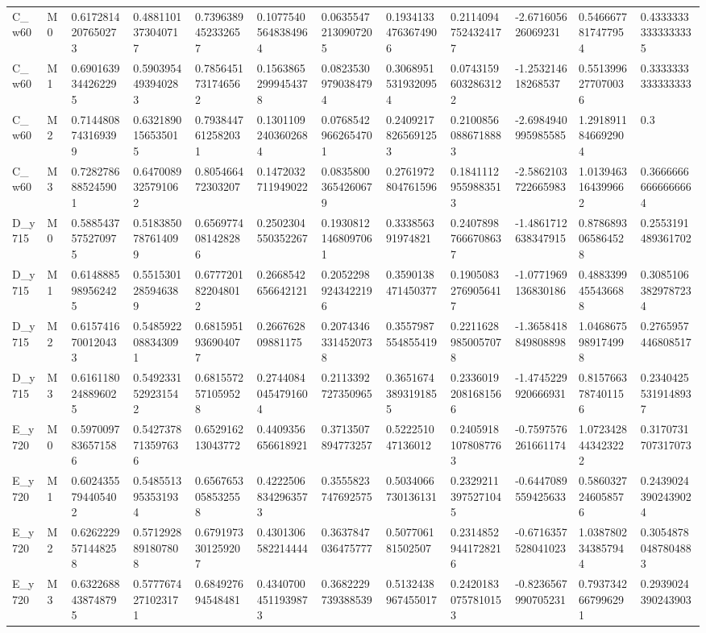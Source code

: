 \begin{tabular}{llllllllllll}
C\_w60 & M0 & 0.6172814207650273 & 0.4881101373040717 & 0.7396389452332657 & 0.10775405648384964 & 0.06355472130907205 & 0.19341334763674906 & 0.21140947524324177 & -2.671605626069231 & 0.5466677817477954 & 0.43333333333333335 \\
C\_w60 & M1 & 0.6901639344262295 & 0.5903954493940283 & 0.7856451731746562 & 0.15638652999454378 & 0.08235309790384794 & 0.30689515319320954 & 0.07431596032863122 & -1.253214618268537 & 0.5513996277070036 & 0.3333333333333333 \\
C\_w60 & M2 & 0.7144808743169399 & 0.6321890156535015 & 0.7938447612582031 & 0.13011092403602684 & 0.07685429662654701 & 0.24092178265691253 & 0.21008560886718883 & -2.6984940995985585 & 1.2918911846692904 & 0.3 \\
C\_w60 & M3 & 0.7282786885245901 & 0.6470089325791062 & 0.805466472303207 & 0.1472032711949022 & 0.08358003654260679 & 0.2761972804761596 & 0.18411129559883513 & -2.5862103722665983 & 1.0139463164399662 & 0.36666666666666664 \\
D\_y715 & M0 & 0.5885437575270975 & 0.5183850787614099 & 0.6569774081428286 & 0.2502304550352267 & 0.19308121468097061 & 0.333856391974821 & 0.24078987666708637 & -1.4861712638347915 & 0.8786893065864528 & 0.2553191489361702 \\
D\_y715 & M1 & 0.6148885989562425 & 0.5515301285946389 & 0.6777201822048012 & 0.2668542656642121 & 0.20522989243422196 & 0.3590138471450377 & 0.19050832769056417 & -1.0771969136830186 & 0.4883399455436688 & 0.30851063829787234 \\
D\_y715 & M2 & 0.6157416700120433 & 0.5485922088343091 & 0.6815951936904077 & 0.266762809881175 & 0.20743463314520738 & 0.3557987554855419 & 0.22116289850057078 & -1.3658418849808898 & 1.0468675989174998 & 0.2765957446808517 \\
D\_y715 & M3 & 0.6161180248896025 & 0.5492331529231542 & 0.6815572571059528 & 0.27440840454791604 & 0.2113392727350965 & 0.36516743893191855 & 0.23360192081681566 & -1.4745229920666931 & 0.8157663787401156 & 0.23404255319148937 \\
E\_y720 & M0 & 0.5970097836571586 & 0.5427378713597636 & 0.652916213043772 & 0.4409356656618921 & 0.3713507894773257 & 0.522251047136012 & 0.24059181078087763 & -0.7597576261661174 & 1.0723428443423222 & 0.3170731707317073 \\
E\_y720 & M1 & 0.6024355794405402 & 0.5485513953531934 & 0.6567653058532558 & 0.42225068342963573 & 0.3555823747692575 & 0.5034066730136131 & 0.23292113975271045 & -0.6447089559425633 & 0.5860327246058576 & 0.24390243902439024 \\
E\_y720 & M2 & 0.6262229571448258 & 0.5712928891807808 & 0.6791973301259207 & 0.4301306582214444 & 0.3637847036475777 & 0.507706181502507 & 0.23148529441728216 & -0.6716357528041023 & 1.0387802343857944 & 0.30548780487804883 \\
E\_y720 & M3 & 0.6322688438748795 & 0.5777674271023171 & 0.684927694548481 & 0.43407004511939873 & 0.3682229739388539 & 0.5132438967455017 & 0.24201830757810153 & -0.8236567990705231 & 0.7937342667996291 & 0.2939024390243903 \\
\bottomrule
\end{tabular}

